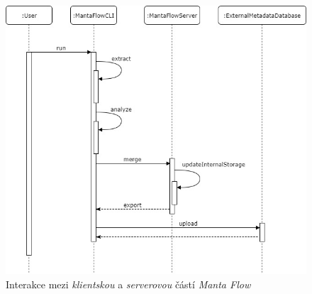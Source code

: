 \documentclass[11pt,twoside,a4paper]{book}
\begin{document}
\begin{figure}
\begin{center}
\includegraphics[width=14cm]{figures/flow_seq}
\caption{Interakce mezi \textit{klientskou} a \textit{serverovou} částí \textit{Manta Flow}}
\label{fig:ana-flow-seq}
\end{center}
\end{figure}
\end{document}
